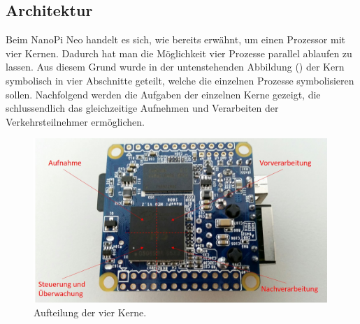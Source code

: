 \subsection{Architektur}
Beim NanoPi Neo handelt es sich, wie bereits erwähnt, um einen Prozessor mit vier Kernen. Dadurch hat man die Möglichkeit vier Prozesse parallel ablaufen zu lassen. Aus diesem Grund wurde in der untenstehenden Abbildung () der Kern symbolisch in vier Abschnitte geteilt, welche die einzelnen Prozesse symbolisieren sollen. Nachfolgend werden die Aufgaben der einzelnen Kerne gezeigt, die schlussendlich das gleichzeitige Aufnehmen und Verarbeiten der Verkehrsteilnehmer ermöglichen.

\begin{figure}[H]
  \centering
  \includegraphics[width=0.99\textwidth]{Software/Architektur.jpg} 
  \caption{Aufteilung der vier Kerne.}
  \label{bArchitektur}
\end{figure}



